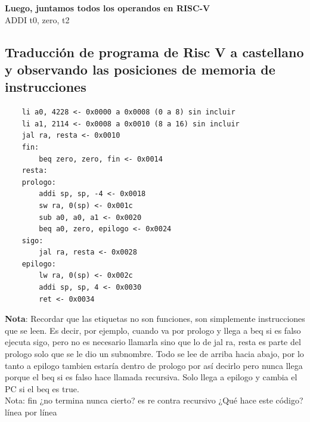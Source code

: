 \documentclass[10pt,a4paper]{article}
\begin{document}
\textbf{Luego, juntamos todos los operandos en RISC-V} \\ 
ADDI t0, zero, t2

\subsection*{Traducción de programa de Risc V a castellano y observando las posiciones de memoria de instrucciones}
\label{subsec:TPRVC}
\begin{lstlisting}
    li a0, 4228 <- 0x0000 a 0x0008 (0 a 8) sin incluir
    li a1, 2114 <- 0x0008 a 0x0010 (8 a 16) sin incluir
    jal ra, resta <- 0x0010
    fin: 
        beq zero, zero, fin <- 0x0014
    resta: 
    prologo:
        addi sp, sp, -4 <- 0x0018
        sw ra, 0(sp) <- 0x001c
        sub a0, a0, a1 <- 0x0020
        beq a0, zero, epilogo <- 0x0024
    sigo: 
        jal ra, resta <- 0x0028
    epilogo:
        lw ra, 0(sp) <- 0x002c
        addi sp, sp, 4 <- 0x0030
        ret <- 0x0034
\end{lstlisting}
\textbf{Nota}: Recordar que las etiquetas no son funciones, son simplemente instrucciones que se leen. Es decir, por ejemplo, cuando va por prologo y llega a beq si es falso ejecuta sigo, pero no es necesario llamarla sino que lo de jal ra, resta es parte del prologo solo que se le dio un subnombre. Todo se lee de arriba hacia abajo, por lo tanto a epilogo tambien estaría dentro de prologo por así decirlo pero nunca llega porque el beq si es falso hace llamada recursiva. Solo llega a epilogo y cambia el PC si el beq es true. \\ 
Nota: fin ¿no termina nunca cierto? es re contra recursivo
¿Qué hace este código? línea por línea
\end{document}
